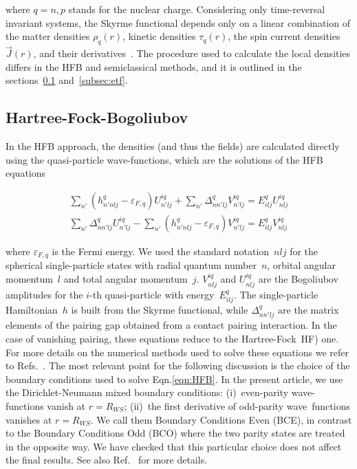 \documentclass[
    amsmath,amssymb,
    aps,
    prc,
    floatfix,
]{revtex4-2}
\begin{document}
\noindent where $q=n,p$ stands for the nuclear charge. Considering only time-reversal invariant systems, the Skyrme functional depends only on a linear combination of the matter densities $\rho_q(r)$, kinetic densities $\tau_q(r)$, the spin current densities $\vec{J}(r)$, and their derivatives~\cite{perlinska2004local}.
The procedure used to calculate the local densities differs in the HFB and semiclassical methods, and it is outlined in the sections~\ref{subsec:HFB} and~\ref{subsec:etf}. 


\subsection{Hartree-Fock-Bogoliubov}\label{subsec:HFB}

In the HFB approach, the densities (and thus the fields) are calculated directly using the quasi-particle wave-functions, which are the solutions of the HFB equations~\cite{ring2004nuclear}

    \begin{eqnarray}\label{eqn:HFB}
        \sum_{n'} (h^q_{n'nlj}-\varepsilon_{F,q})U_{n'lj}^{iq}+\sum_{n'}\Delta^q_{nn'lj}V^{iq}_{n'lj}=E^q_{ilj}U^{iq}_{nlj}\\
        \sum_{n'}\Delta^q_{nn'lj}U^{iq}_{n'lj}-\sum_{n'} (h^q_{n'nlj}-\varepsilon_{F,q})V_{n'lj}^{iq}=E^q_{ilj}V^{iq}_{nlj}
    \end{eqnarray}

\noindent where $\varepsilon_{F,q}$ is the Fermi energy. We used the standard notation~$nlj$ for the spherical single-particle states with radial quantum number~$n$, orbital angular momentum~$l$ and total angular momentum~$j$. $V_{nlj}^{iq}$ and $U_{nlj}^{iq}$ are the Bogoliubov amplitudes for the $i$-th quasi-particle with energy~$E^q_{ilj}$. The single-particle Hamiltonian~$h$ is built from the Skyrme functional, while $\Delta_{nn'lj}^q$ are the matrix elements of the pairing gap obtained from a contact pairing interaction. In the case of vanishing pairing, these equations reduce to the Hartree-Fock~HF) one.
For more details on the numerical methods used to solve these equations we refer to Refs.~\cite{pastore2017new,pastore2011superfluid,pastore2012superfluid,pastore2013pairing}.
The most relevant point for the following discussion is the choice of the boundary conditions used to solve Eqn.\ref{eqn:HFB}.
In the present article, we use the Dirichlet-Neumann mixed boundary conditions: (i)~even-parity wave-functions vanish at $r = R_{WS}$; (ii)~the first derivative of odd-parity wave~functions vanishes at $r = R_{WS}$. We call them Boundary Conditions Even (BCE), in contrast to the Boundary Conditions Odd (BCO) where the two parity states are treated in the opposite way.
We have checked that this particular choice does not affect the final results. See also Ref.~\cite{pastore2017new} for more details.
\end{document}
